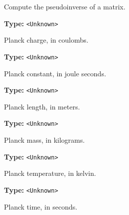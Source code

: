 \documentclass[12pt,a4paper]{article}
\begin{document}
\noindent Compute the pseudoinverse of a matrix.

\vspace{5mm}
\noindent {}\vspace{4mm}


\noindent \textbf{Type:} \texttt{<Unknown>}

\noindent Planck charge, in coulombs.

\vspace{5mm}
\noindent {}\vspace{4mm}


\noindent \textbf{Type:} \texttt{<Unknown>}

\noindent Planck constant, in joule seconds.

\vspace{5mm}
\noindent {}\vspace{4mm}


\noindent \textbf{Type:} \texttt{<Unknown>}

\noindent Planck length, in meters.

\vspace{5mm}
\noindent {}\vspace{4mm}


\noindent \textbf{Type:} \texttt{<Unknown>}

\noindent Planck mass, in kilograms.

\vspace{5mm}
\noindent {}\vspace{4mm}


\noindent \textbf{Type:} \texttt{<Unknown>}

\noindent Planck temperature, in kelvin.

\vspace{5mm}
\noindent {}\vspace{4mm}


\noindent \textbf{Type:} \texttt{<Unknown>}

\noindent Planck time, in seconds.
\end{document}
